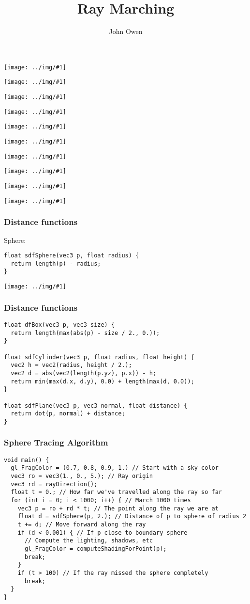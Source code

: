 \documentclass{beamer}
\title{Ray Marching}
\author{John Owen}
\date{}
\newcommand\graphic[1]{\texttt{[image: ../img/\#1]}}
\newcommand\imageframe[1]{
    \begin{frame}[plain]
        \texttt{[image: ../img/\#1]}
    \end{frame}
}
\begin{document}
\frame{\titlepage}

\imageframe{raymarch1.png}
\imageframe{raymarch2.png}
\imageframe{raymarch3.png}
\imageframe{raymarch4.png}
\imageframe{raymarch5.png}
\imageframe{raymarch6.png}
\imageframe{raymarch7.png}
\imageframe{raymarch8.png}
\imageframe{raymarch9.png}
\imageframe{raymarch10.png}

\begin{frame}[fragile]
    \frametitle{Distance functions}
        Sphere:
    \begin{verbatim}
float sdfSphere(vec3 p, float radius) {
  return length(p) - radius;
}
    \end{verbatim}
    \graphic{looking-outside-circle.png}
\end{frame}

\begin{frame}[fragile]
    \frametitle{Distance functions}
    \begin{verbatim}
float dfBox(vec3 p, vec3 size) {
  return length(max(abs(p) - size / 2., 0.));
}

float sdfCylinder(vec3 p, float radius, float height) {
  vec2 h = vec2(radius, height / 2.);
  vec2 d = abs(vec2(length(p.yz), p.x)) - h;
  return min(max(d.x, d.y), 0.0) + length(max(d, 0.0));
}

float sdfPlane(vec3 p, vec3 normal, float distance) {
  return dot(p, normal) + distance;
}
    \end{verbatim}
\end{frame}


\begin{frame}[fragile]
    \frametitle{Sphere Tracing Algorithm}
    \begin{verbatim}
void main() {
  gl_FragColor = (0.7, 0.8, 0.9, 1.) // Start with a sky color
  vec3 ro = vec3(1., 0., 5.); // Ray origin
  vec3 rd = rayDirection();
  float t = 0.; // How far we've travelled along the ray so far
  for (int i = 0; i < 1000; i++) { // March 1000 times
    vec3 p = ro + rd * t; // The point along the ray we are at
    float d = sdfSphere(p, 2.); // Distance of p to sphere of radius 2
    t += d; // Move forward along the ray
    if (d < 0.001) { // If p close to boundary sphere
      // Compute the lighting, shadows, etc
      gl_FragColor = computeShadingForPoint(p);
      break;
    }
    if (t > 100) // If the ray missed the sphere completely
      break;
  }
}
    \end{verbatim}
\end{frame}
\end{document}

